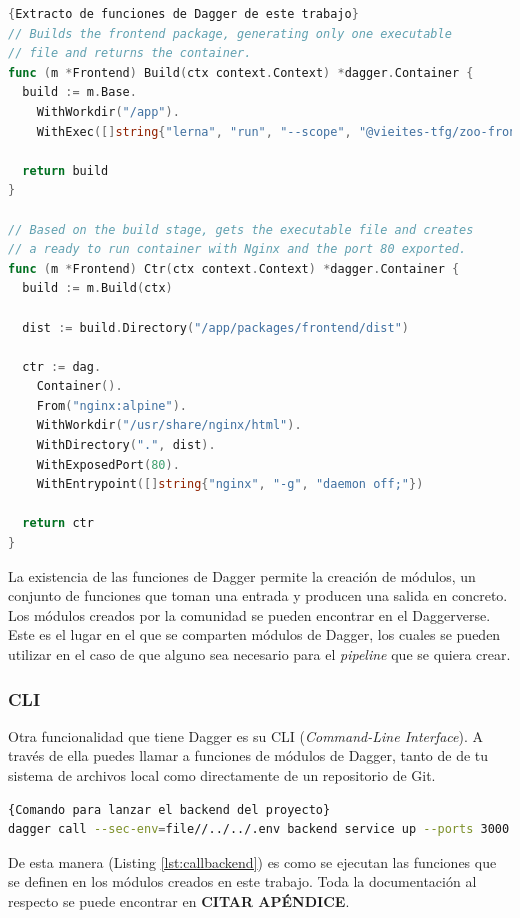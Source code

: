 \begin{lstlisting}[language=go,label=lst:daggerfunctions]{Extracto de funciones de Dagger de este trabajo}
// Builds the frontend package, generating only one executable
// file and returns the container.
func (m *Frontend) Build(ctx context.Context) *dagger.Container {
  build := m.Base.
    WithWorkdir("/app").
    WithExec([]string{"lerna", "run", "--scope", "@vieites-tfg/zoo-frontend", "build"})

  return build
}

// Based on the build stage, gets the executable file and creates
// a ready to run container with Nginx and the port 80 exported.
func (m *Frontend) Ctr(ctx context.Context) *dagger.Container {
  build := m.Build(ctx)

  dist := build.Directory("/app/packages/frontend/dist")

  ctr := dag.
    Container().
    From("nginx:alpine").
    WithWorkdir("/usr/share/nginx/html").
    WithDirectory(".", dist).
    WithExposedPort(80).
    WithEntrypoint([]string{"nginx", "-g", "daemon off;"})

  return ctr
}
\end{lstlisting}

La existencia de las funciones de Dagger permite la creación de módulos, un conjunto de funciones que toman una entrada y producen una salida en concreto. Los módulos creados por la comunidad se pueden encontrar en el Daggerverse\cite{daggerverse}. Este es el lugar en el que se comparten módulos de Dagger, los cuales se pueden utilizar en el caso de que alguno sea necesario para el \textit{pipeline} que se quiera crear.

\subsubsection*{CLI}

Otra funcionalidad que tiene Dagger es su CLI\cite{cli} (\textit{Command-Line Interface}). A través de ella puedes llamar a funciones de módulos de Dagger, tanto de de tu sistema de archivos local como directamente de un repositorio de Git.

\begin{lstlisting}[language=bash,label=lst:callbackend]{Comando para lanzar el backend del proyecto}
dagger call --sec-env=file//../../.env backend service up --ports 3000:3000
\end{lstlisting}

De esta manera (Listing \ref{lst:callbackend}) es como se ejecutan las funciones que se definen en los módulos creados en este trabajo. Toda la documentación al respecto se puede encontrar en \textbf{CITAR APÉNDICE}.

